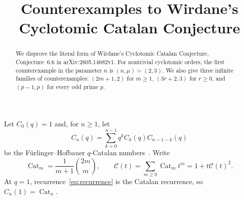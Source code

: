 \documentclass[11pt]{amsart}
\title[Counterexamples to a Cyclotomic Catalan Conjecture]
{Counterexamples to Wirdane's Cyclotomic Catalan Conjecture}
\date{}
\theoremstyle{remark}
\newcommand{\Cat}{\operatorname{Cat}}
\begin{document}
\begin{abstract}
We disprove the literal form of Wirdane's Cyclotomic Catalan
Conjecture, Conjecture~6.6 in arXiv:2605.14682v1. For nontrivial
cyclotomic orders, the first counterexample in the parameter $n$ is
$(n,\mu)=(2,3)$. We also give three infinite families of
counterexamples: $(2m+1,2)$ for $m\ge1$, $(3r+2,3)$ for $r\ge0$,
and $(p-1,p)$ for every odd prime $p$.
\end{abstract}

\maketitle

Let $C_0(q)=1$ and, for $n\ge1$, let
\begin{equation}\label{eq:recurrence}
  C_n(q)=\sum_{k=0}^{n-1}q^k C_k(q)C_{n-1-k}(q)
\end{equation}
be the F\"urlinger--Hofbauer $q$-Catalan numbers~\cite{FH}. Write
\[
  \Cat_m=\frac{1}{m+1}\binom{2m}{m},
  \qquad
  \mathcal C(t)=\sum_{m\ge0}\Cat_m t^m
               =1+t\mathcal C(t)^2.
\]
At $q=1$, recurrence~\eqref{eq:recurrence} is the Catalan recurrence,
so $C_n(1)=\Cat_n$.
\end{document}
